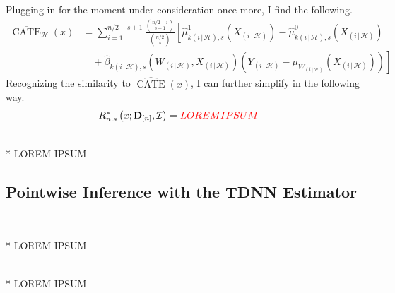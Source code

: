 Plugging in for the moment under consideration once more, I find the following.
\begin{equation}
	\begin{aligned}
		\overline{\operatorname{CATE}}_{\mathcal{H}}\left(x\right) 
		& = \sum_{i = 1}^{n/2 - s + 1} \frac{\binom{n/2-i}{s-1}}{\binom{n/2}{s}} 
		\left[\hat{\mu}_{k(i \, | \, \mathcal{H}),s}^{1}\left(X_{(i \, | \, \mathcal{H})}\right) 
		- \hat{\mu}_{k(i \, | \, \mathcal{H}),s}^{0}\left(X_{(i \, | \, \mathcal{H})}\right) \right.\\
		& \left. \quad + \hat{\beta}_{k(i \, | \, \mathcal{H}),s}\left(W_{(i \, | \, \mathcal{H})}, X_{(i \, | \, \mathcal{H})}\right)\left(Y_{(i \, | \, \mathcal{H})} - \mu_{W_{(i \, | \, \mathcal{H})}}\left(X_{(i \, | \, \mathcal{H})}\right)\right)\right]
	\end{aligned}
\end{equation}
Recognizing the similarity to $\widehat{\operatorname{CATE}}\left(x\right)$, I can further simplify in the following way.
\begin{equation}
	\begin{aligned}
		R^{*}_{n,s}\left(x; \mathbf{D}_{[n]}, \mathcal{I}\right)
		& = {\color{red} LOREM IPSUM}
	\end{aligned}
\end{equation}

\begin{boxD}
	\begin{thm}\label{thm:CATE_DNN_DML_Var_Est}\mbox{}\\*
		{\color{red} LOREM IPSUM}
	\end{thm}
\end{boxD}

\subsection{Pointwise Inference with the TDNN Estimator}
\hrule
\begin{boxD}
	\begin{thm}\label{thm:pw_inf_TDNN}\mbox{}\\*
		{\color{red} LOREM IPSUM}
	\end{thm}
\end{boxD}

\begin{boxD}
	\begin{thm}\label{thm:pw_inf_TDNN_HTE}\mbox{}\\*
		{\color{red} LOREM IPSUM}
	\end{thm}
\end{boxD}
